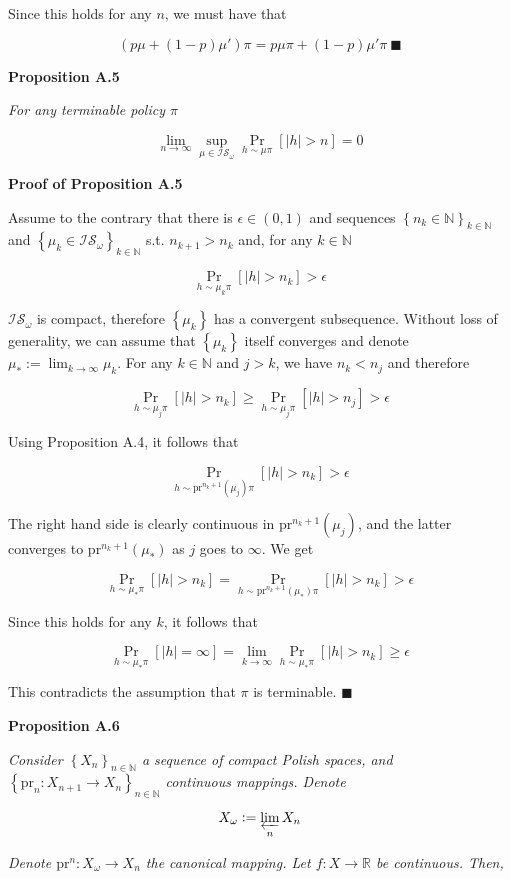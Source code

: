 \documentclass[a4paper]{article}
\newcommand{\Co}[1]{}
\newcommand{\AP}[1]{\left(#1\right)}
\newcommand{\AB}[1]{\left[#1\right]}
\newcommand{\AC}[1]{\left\{#1\right\}}
\newcommand{\Pa}[2]{\underset{#1}{\operatorname{Pr}}\AB{#2}}
\newcommand{\Nats}{\mathbb{N}}
\newcommand{\Reals}{\mathbb{R}}
\newcommand{\Lim}[1]{\lim_{#1 \rightarrow \infty}}
\newcommand{\Abs}[1]{\left\vert #1 \right\vert}
\newcommand{\IS}{\mathcal{IS}}
\newcommand{\Prj}{\mathrm{pr}}
\begin{document}
Since this holds for any $n$, we must have that

$$\AP{p\mu+(1-p)\mu'}\pi=p\mu\pi+(1-p)\mu'\pi\ \blacksquare$$

\textbf{Proposition A.5}\Co{b}

\textit{For any terminable policy $\pi$}\Co{i}

$$\Lim{n}\sup_{\mu\in\IS_\omega}\Pa{h\sim\mu\pi}{\Abs{h}>n}=0$$

\textbf{Proof of Proposition A.5}\Co{b}

Assume to the contrary that there is $\epsilon\in(0,1)$ and sequences $\AC{n_k\in\Nats}_{k\in\Nats}$ and $\AC{\mu_k\in\IS_\omega}_{k\in\Nats}$ s.t. $n_{k+1} > n_k$ and, for any $k\in\Nats$

$$\Pa{h\sim\mu_k\pi}{\Abs{h}>n_k} > \epsilon$$

$\IS_\omega$ is compact, therefore $\AC{\mu_k}$ has a convergent subsequence. Without loss of generality, we can assume that $\AC{\mu_k}$ itself converges and denote $\mu_*:=\Lim{k}\mu_k$. For any $k\in\Nats$ and $j > k$, we have $n_k < n_j$ and therefore

$$\Pa{h\sim\mu_j\pi}{\Abs{h}>n_k} \geq \Pa{h\sim\mu_j\pi}{\Abs{h}>n_j} > \epsilon$$

Using Proposition A.4, it follows that

$$\Pa{h\sim\Prj^{n_k+1}\AP{\mu_j}\pi}{\Abs{h}>n_k} > \epsilon$$

The right hand side is clearly continuous in $\Prj^{n_k+1}\AP{\mu_j}$, and the latter converges to $\Prj^{n_k+1}\AP{\mu_*}$ as $j$ goes to $\infty$. We get

$$\Pa{h\sim\mu_*\pi}{\Abs{h}>n_k}=\Pa{h\sim\Prj^{n_k+1}\AP{\mu_*}\pi}{\Abs{h}>n_k} > \epsilon$$

Since this holds for any $k$, it follows that

$$\Pa{h\sim\mu_*\pi}{\Abs{h}=\infty}=\Lim{k}\Pa{h\sim\mu_*\pi}{\Abs{h}>n_k} \geq \epsilon$$

This contradicts the assumption that $\pi$ is terminable. $\blacksquare$

\textbf{Proposition A.6}\Co{b}

\textit{Consider $\AC{X_n}_{n\in\Nats}$ a sequence of compact Polish spaces, and $\AC{\Prj_n:X_{n+1}\rightarrow X_n}_{n\in\Nats}$ continuous mappings. Denote}\Co{i}

$$X_\omega:=\varprojlim_n X_n$$

\textit{Denote $\Prj^n:X_\omega\rightarrow X_n$ the canonical mapping. Let $f:X\rightarrow\Reals$ be continuous. Then,}\Co{i}
\end{document}
